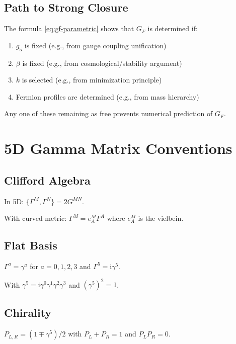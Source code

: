 \documentclass[11pt,a4paper]{article}
\newcommand{\ii}{\mathrm{i}}
\begin{document}
\subsection{Path to Strong Closure}

The formula \eqref{eq:gf-parametric} shows that $G_F$ is determined if:
\begin{enumerate}
\item $g_5$ is fixed (e.g., from gauge coupling unification)
\item $\beta$ is fixed (e.g., from cosmological/stability argument)
\item $k$ is selected (e.g., from minimization principle)
\item Fermion profiles are determined (e.g., from mass hierarchy)
\end{enumerate}

Any one of these remaining as free prevents numerical prediction of $G_F$.

\appendix

\section{5D Gamma Matrix Conventions}
\label{app:gamma}

\subsection{Clifford Algebra}

In 5D: $\{\Gamma^M, \Gamma^N\} = 2G^{MN}$.

With curved metric: $\Gamma^M = e_A^M \Gamma^A$ where $e_A^M$ is the vielbein.

\subsection{Flat Basis}

$\Gamma^a = \gamma^a$ for $a = 0,1,2,3$ and $\Gamma^5 = \ii\gamma^5$.

With $\gamma^5 = \ii\gamma^0\gamma^1\gamma^2\gamma^3$ and $(\gamma^5)^2 = 1$.

\subsection{Chirality}

$P_{L,R} = (1 \mp \gamma^5)/2$ with $P_L + P_R = 1$ and $P_L P_R = 0$.
\end{document}
